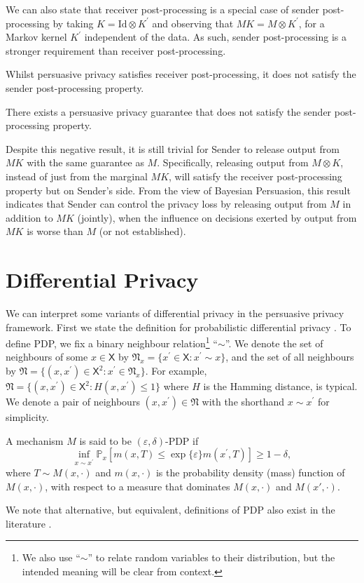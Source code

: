 \documentclass{article}
\theoremstyle{plain}
\theoremstyle{plain}
\theoremstyle{definition}
\theoremstyle{remark}
\theoremstyle{plain}
\renewcommand{\Pr}{\mathbb{P}}
\newcommand{\PrMx}{\Pr_{x}}
\newcommand{\xset}{\mathsf{X}}
\begin{document}
We can also state that receiver post-processing is a special case of sender post-processing by taking $K = \mathrm{Id} \otimes K^\prime$ and observing that $MK = M\otimes K^\prime$, for a Markov kernel $K^\prime$ independent of the data. As such, sender post-processing is a stronger requirement than receiver post-processing. 

Whilst persuasive privacy satisfies receiver post-processing, it does not satisfy the sender post-processing property.
\begin{proposition}\label{prop:sendpost}
    There exists a persuasive privacy guarantee that does not satisfy the sender post-processing property.
\end{proposition}
 Despite this negative result, it is still trivial for Sender to release output from $MK$ with the same guarantee as $M$. Specifically, releasing output from $M\otimes K$, instead of just from the marginal $MK$, will satisfy the receiver post-processing property but on Sender's side.
From the view of Bayesian Persuasion, this result indicates that Sender can control the privacy loss by releasing output from $M$ in addition to $MK$ (jointly), when the influence on decisions exerted by output from $MK$ is worse than $M$ (or not established).


\section{Differential Privacy}\label{sec:dp}

We can interpret some variants of differential privacy in the persuasive privacy framework. First we state the definition for probabilistic differential privacy \citep[PDP,][]{machanavajjhala2008privacy,gotz2011publishing, meiser2018approximate}. To define PDP, we fix a binary neighbour relation\footnote{We also use ``$\sim$'' to relate random variables to their distribution, but the intended meaning will be clear from context.} ``$\sim$''. We denote the set of neighbours of some $x \in \xset$ by $\mathfrak{N}_x = \{x^\prime\in\xset:x^\prime\sim x\}$, and the set of all neighbours by $\mathfrak{N}=\{(x,x^\prime) \in \xset^2:x^\prime \in \mathfrak{N}_x\}$.  For example, $\mathfrak{N} = \{(x,x^\prime) \in \xset^2: H(x,x^\prime)\leq 1\}$ where $H$ is the Hamming distance, is typical. We denote a pair of neighbours $(x, x^\prime) \in \mathfrak{N}$ with the shorthand $x\sim x^\prime$ for simplicity.

\begin{definition}\label{def:pdp}
    A mechanism $M$ is said to be $(\varepsilon,\delta)$-PDP if
    \begin{equation*}
        \inf_{x\sim x^\prime}\PrMx\left[ m(x,T) \leq \exp\{\varepsilon\} m(x^\prime,T) \right] \geq 1 - \delta,
    \end{equation*}
    where $T\sim M(x,\cdot)$ and $m(x,\cdot)$ is the probability density (mass) function of $M(x, \cdot)$, with respect to a measure that dominates $M(x, \cdot)$ and $M(x', \cdot)$.
\end{definition}
We note that alternative, but equivalent, definitions of PDP also exist in the literature \citep[e.g.,][Definition 4]{meiser2018approximate}.
\end{document}
